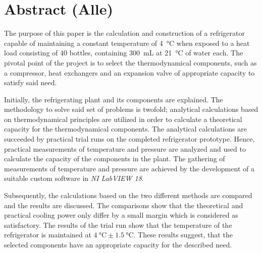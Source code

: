 \documentclass[../Hovedrapport.tex]{subfiles}
\begin{document}
\vspace{-30pt}
\chapter*{Abstract (Alle)}       %
    \label{chap:resume}
The purpose of this paper is the calculation and construction of a refrigerator capable of maintaining a constant temperature of \SI{4}{\celsius} when exposed to a heat load consisting of 40 bottles, containing \SI{300}{mL} at \SI{21}{\celsius} of water each. The pivotal point of the project is to select the thermodynamical components, such as a compressor, heat exchangers and an expansion valve of appropriate capacity to satisfy said need.

Initially, the refrigerating plant and its components are explained. The methodology to solve said set of problems is twofold; analytical calculations based on thermodynamical principles are utilized in order to calculate a theoretical capacity for the thermodynamical components. The analytical calculations are succeeded by practical trial runs on the completed refrigerator prototype. Hence, practical measurements of temperature and pressure are analyzed and used to calculate the capacity of the components in the plant. The gathering of measurements of temperature and pressure are achieved by the development of a suitable custom software in \textit{NI LabVIEW 18}.

Subsequently, the calculations based on the two different methods are compared and the results are discussed. The comparisons show that the theoretical and practical cooling power only differ by a small margin which is considered as satisfactory. The results of the trial run show that the temperature of the refrigerator is maintained at $\SI{4}{\celsius} \pm \SI{1,5}{\celsius}$. These results suggest, that the selected components have an appropriate capacity for the described need.

\clearpage
\end{document}
